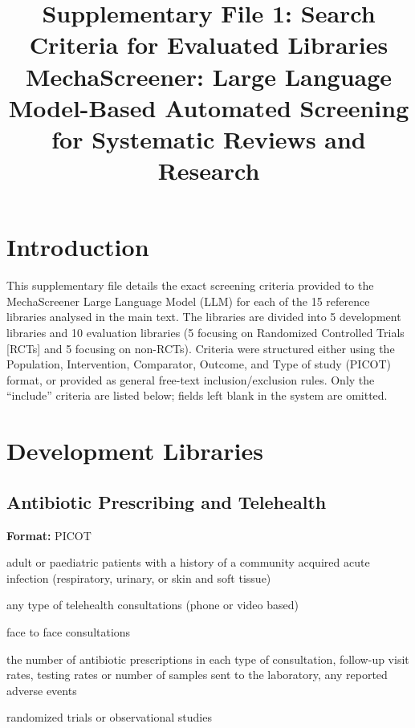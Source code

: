 \documentclass[11pt,a4paper]{article}
\title{Supplementary File 1: Search Criteria for Evaluated Libraries\\
\large MechaScreener: Large Language Model-Based Automated Screening for Systematic Reviews and Research}
\author{}
\date{}
\begin{document}
\maketitle

\section*{Introduction}
This supplementary file details the exact screening criteria provided to the MechaScreener Large Language Model (LLM) for each of the 15 reference libraries analysed in the main text. The libraries are divided into 5 development libraries and 10 evaluation libraries (5 focusing on Randomized Controlled Trials [RCTs] and 5 focusing on non-RCTs). Criteria were structured either using the Population, Intervention, Comparator, Outcome, and Type of study (PICOT) format, or provided as general free-text inclusion/exclusion rules. Only the ``include'' criteria are listed below; fields left blank in the system are omitted.

\tableofcontents
\vspace{1cm}

\section{Development Libraries}

\subsection{Antibiotic Prescribing and Telehealth}
\textbf{Format:} PICOT
\begin{description}[style=nextline]
    \item[Population:] adult or paediatric patients with a history of a community acquired acute infection (respiratory, urinary, or skin and soft tissue)
    \item[Intervention:] any type of telehealth consultations (phone or video based)
    \item[Comparator:] face to face consultations
    \item[Outcome:] the number of antibiotic prescriptions in each type of consultation, follow-up visit rates, testing rates or number of samples sent to the laboratory, any reported adverse events
    \item[Type of study:] randomized trials or observational studies
\end{description}
\end{document}
